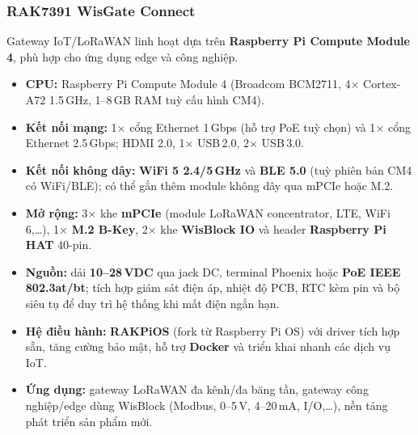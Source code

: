             \subsubsection*{RAK7391 WisGate Connect}
                Gateway IoT/LoRaWAN linh hoạt dựa trên \textbf{Raspberry Pi Compute Module 4}, phù hợp cho ứng dụng edge và công nghiệp.
                \begin{itemize}
                    \item \textbf{CPU:} Raspberry Pi Compute Module 4 (Broadcom BCM2711, 4$\times$ Cortex-A72 1{.}5\,GHz, 1--8\,GB RAM tuỳ cấu hình CM4).
                    \item \textbf{Kết nối mạng:} 1$\times$ cổng Ethernet 1\,Gbps (hỗ trợ PoE tuỳ chọn) và 1$\times$ cổng Ethernet 2{.}5\,Gbps; HDMI 2{.}0, 1$\times$ USB\,2{.}0, 2$\times$ USB\,3{.}0.
                    \item \textbf{Kết nối không dây:} \textbf{WiFi 5 2{.}4/5\,GHz} và \textbf{BLE 5{.}0} (tuỳ phiên bản CM4 có WiFi/BLE); có thể gắn thêm module không dây qua mPCIe hoặc M.2.
                    \item \textbf{Mở rộng:} 3$\times$ khe \textbf{mPCIe} (module LoRaWAN concentrator, LTE, WiFi 6,\dots), 1$\times$ \textbf{M.2 B-Key}, 2$\times$ khe \textbf{WisBlock IO} và header \textbf{Raspberry Pi HAT} 40-pin.
                    \item \textbf{Nguồn:} dải \textbf{10--28\,VDC} qua jack DC, terminal Phoenix hoặc \textbf{PoE IEEE 802{.}3at/bt}; tích hợp giám sát điện áp, nhiệt độ PCB, RTC kèm pin và bộ siêu tụ để duy trì hệ thống khi mất điện ngắn hạn.
                    \item \textbf{Hệ điều hành:} \textbf{RAKPiOS} (fork từ Raspberry Pi OS) với driver tích hợp sẵn, tăng cường bảo mật, hỗ trợ \textbf{Docker} và triển khai nhanh các dịch vụ IoT.
                    \item \textbf{Ứng dụng:} gateway LoRaWAN đa kênh/đa băng tần, gateway công nghiệp/edge dùng WisBlock (Modbus, 0--5\,V, 4--20\,mA, I/O,\dots), nền tảng phát triển sản phẩm mới.
                \end{itemize}
            
